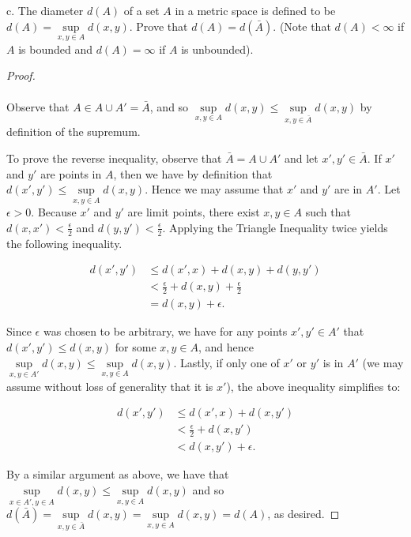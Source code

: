\pagebreak

c.  The diameter $d(A)$ of a set $A$ in a metric space is defined to be $d(A) = \sup\limits_{x,y \in A}{d(x, y)}$. Prove
    that $d(A) = d(\bar{A})$. (Note that $d(A) < \infty$ if $A$ is bounded and $d(A) = \infty$ if $A$ is unbounded).

\begin{proof}\renewcommand{\qedsymbol}{}\ \\\\
    Observe that $A \in A \cup A' = \bar{A}$, and so 
    $\sup\limits_{x,y \in A}{d(x, y)} \le \sup\limits_{x,y \in \bar{A}}{d(x, y)}$
    by definition of the supremum.

    To prove the reverse inequality, observe that $\bar{A} = A \cup A'$ and let $x', y' \in \bar{A}$. If $x'$ and $y'$ 
    are points in $A$, then we have by definition that $d(x', y') \le \sup\limits_{x,y \in A}{d(x, y)}$. Hence we may 
    assume that $x'$ and $y'$ are in $A'$. Let $\epsilon > 0$. Because $x'$ and $y'$ are limit points, there exist 
    $x, y \in A$ such that $d(x, x') < \frac{\epsilon}{2}$ and $d(y, y') < \frac{\epsilon}{2}$. Applying the Triangle
    Inequality twice yields the following inequality.

    \begin{align*}
        d(x', y') &\le d(x', x) + d(x, y) + d(y, y') \\
                  &< \frac{\epsilon}{2} + d(x, y) + \frac{\epsilon}{2} \\
                  &= d(x, y) + \epsilon.
    \end{align*}

    Since $\epsilon$ was chosen to be arbitrary, we have for any points $x', y' \in A'$ that $d(x', y') \le d(x, y)$ for
    some $x, y \in A$, and hence $\sup\limits_{x,y \in A'}{d(x, y)} \le \sup\limits_{x,y \in A}{d(x, y)}$. Lastly, if
    only one of $x'$ or $y'$ is in $A'$ (we may assume without loss of generality that it is $x'$), the above inequality
    simplifies to:
    
    \begin{align*}
        d(x', y') &\le d(x', x) + d(x, y') \\
                  &< \frac{\epsilon}{2} + d(x, y') \\
                  &< d(x, y') + \epsilon.
    \end{align*}

    By a similar argument as above, we have that
    $\sup\limits_{x \in A', y \in A}{d(x, y)} \le \sup\limits_{x,y \in A}{d(x, y)}$ and so
    $d(\bar{A}) = \sup\limits_{x,y \in \bar{A}}{d(x, y)} = \sup\limits_{x,y \in A}{d(x, y)} = d(A)$, as desired.
\end{proof}

\pagebreak